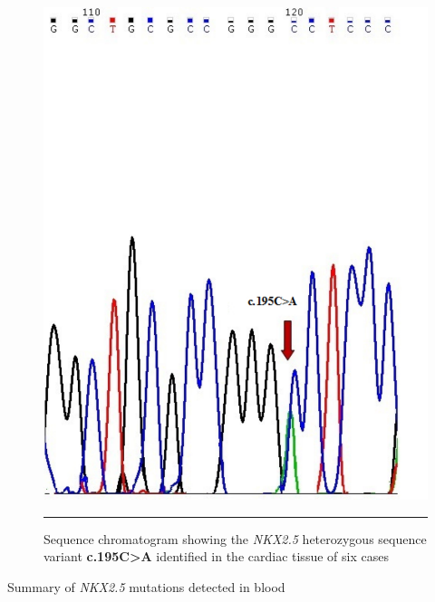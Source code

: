 \begin{refsection}
\begin{figure}[!htb]
\centering
\includegraphics[scale=0.5,keepaspectratio]{Figures/Figure5_3.pdf}
\rule{35em}{0.5pt}
\caption[Sequence chromatogram showing the \textit{NKX2.5} heterozygous sequence variant]{Sequence chromatogram showing the \textit{NKX2.5} heterozygous sequence variant \textbf{c.195C>A} identified in the cardiac tissue of six cases}
\label{fig:5_3}
\end{figure}



\begin{landscape}
\begin{table}[!p]
\renewcommand{\arraystretch}{1.1}
\centering
\caption[Summary of \textit{NKX2.5} mutations detected in blood]{Summary of \textit{NKX2.5} mutations detected in blood}
\label{tab:5_3}


\end{table}
\end{landscape}
\end{refsection}
